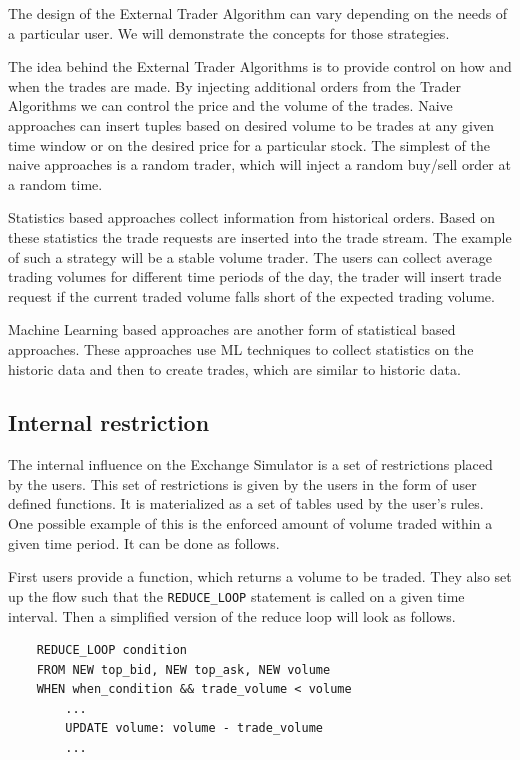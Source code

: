 \documentclass{article}
\begin{document}
The design of the External Trader Algorithm can vary depending on the needs of a particular user. We will demonstrate the concepts for those strategies.

The idea behind the External Trader Algorithms is to provide control on how and when the trades are made. By injecting additional orders from the Trader Algorithms we can control the price and the volume of the trades. Naive approaches can insert tuples based on desired volume to be trades at any given time window or on the desired price for a particular stock. The simplest of the naive approaches is a random trader, which will inject a random buy/sell order at a random time.  

Statistics based approaches collect information from historical orders. Based on these statistics the trade requests are inserted into the trade stream. The example of such a strategy will be a stable volume trader. The users can collect average trading volumes for different time periods of the day, the trader will insert trade request if the current traded volume falls short of the expected trading volume.

Machine Learning based approaches are another form of statistical based approaches. These approaches use ML techniques to collect statistics on the historic data and then to create trades, which are similar to historic data. 

\subsection{Internal restriction}

The internal influence on the Exchange Simulator is a set of restrictions placed by the users. This set of restrictions is given by the users in the form of user defined functions. It is materialized as a set of tables used by the user's rules. One possible example of this is the enforced amount of volume traded within a given time period. It can be done as follows. 

First users provide a function, which returns a volume to be traded. They also set up the flow such that the {\tt REDUCE\_LOOP} statement is called on a given time interval. Then a simplified version of the reduce loop will look as follows.

\begin{verbatim}
    REDUCE_LOOP condition
    FROM NEW top_bid, NEW top_ask, NEW volume
    WHEN when_condition && trade_volume < volume
        ...
        UPDATE volume: volume - trade_volume
        ...
\end{verbatim}
\end{document}
